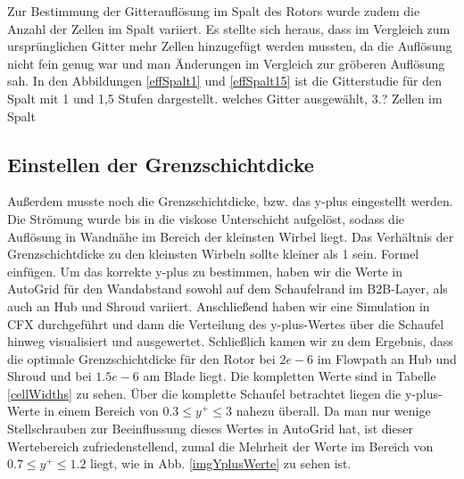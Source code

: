 Zur Bestimmung der Gitterauflösung im Spalt des Rotors wurde zudem die Anzahl der Zellen im Spalt variiert. Es stellte sich heraus, dass im Vergleich zum ursprünglichen Gitter mehr Zellen hinzugefügt werden mussten, da die Auflösung nicht fein genug war und man Änderungen im Vergleich zur gröberen Auflösung sah.  In den Abbildungen \ref{effSpalt1} und \ref{effSpalt15} ist die Gitterstudie für den Spalt mit 1 und 1,5 Stufen dargestellt. \todo welches Gitter ausgewählt, 3.? \todo Zellen im Spalt


%

\subsection{Einstellen der Grenzschichtdicke}
Außerdem musste noch die Grenzschichtdicke, bzw. das y-plus eingestellt werden. Die Strömung wurde bis in die viskose Unterschicht aufgelöst, sodass die Auflösung in Wandnähe im Bereich der kleinsten Wirbel liegt. Das Verhältnis der Grenzschichtdicke zu den kleinsten Wirbeln sollte kleiner als 1 sein. \todo Formel einfügen. Um das korrekte y-plus zu bestimmen, haben wir die Werte in AutoGrid für den Wandabstand sowohl auf dem Schaufelrand im B2B-Layer, als auch an Hub und Shroud variiert.  Anschließend haben wir eine Simulation in CFX durchgeführt und dann die Verteilung des y-plus-Wertes über die Schaufel hinweg visualisiert und ausgewertet. Schließlich kamen wir zu dem Ergebnis, dass die optimale Grenzschichtdicke für den Rotor bei $2e-6$ im Flowpath an Hub und Shroud und bei $1.5e-6$ am Blade liegt. Die kompletten Werte sind in Tabelle \ref{cellWidths} zu sehen. Über die komplette Schaufel betrachtet liegen die y-plus-Werte in einem Bereich von $0.3 \leq y^+ \leq 3$ nahezu überall. Da man nur wenige Stellschrauben zur Beeinflussung dieses Wertes in AutoGrid hat, ist dieser Wertebereich zufriedenstellend, zumal die Mehrheit der Werte im Bereich von $0.7 \leq y^+ \leq 1.2$  liegt, wie in Abb. \ref{imgYplusWerte} zu sehen ist. 

